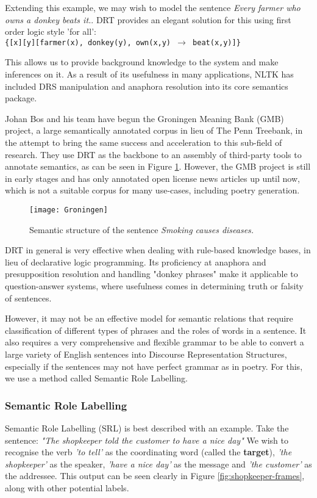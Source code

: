 Extending this example, we may wish to model the sentence \textit{Every farmer who owns a donkey beats it.}. DRT provides an elegant solution for this using first order logic style 'for all':\\
\texttt{\{[x][y][farmer(x), donkey(y), own(x,y) $\rightarrow$ beat(x,y)]\}}

This allows us to provide background knowledge to the system and make inferences on it. As a result of its usefulness in many applications, NLTK has included DRS manipulation and anaphora resolution into its core semantics package.

Johan Bos and his team have begun the Groningen Meaning Bank (GMB) project\cite{BasileBosEvangVenhuizen2012LREC}, a large semantically annotated corpus in lieu of The Penn Treebank, in the attempt to bring the same success and acceleration to this sub-field of research. They use DRT as the backbone to an assembly of third-party tools to annotate semantics, as can be seen in Figure \ref{fig:gmb}. However, the GMB project is still in early stages and has only annotated open license news articles up until now, which is not a suitable corpus for many use-cases, including poetry generation.

\begin{figure}[h!]
\centering
\texttt{[image: Groningen]}
\caption{Semantic structure of the sentence \textit{Smoking causes diseases.}}
\label{fig:gmb}
\end{figure}

DRT in general is very effective when dealing with rule-based knowledge bases, in lieu of declarative logic programming. Its proficiency at anaphora and presupposition resolution and handling "donkey phrases" make it applicable to question-answer systems, where usefulness comes in determining truth or falsity of sentences.

However, it may not be an effective model for semantic relations that require classification of different types of phrases and the roles of words in a sentence. It also requires a very comprehensive and flexible grammar to be able to convert a large variety of English sentences into Discourse Representation Structures, especially if the sentences may not have perfect grammar as in poetry. For this, we use a method called Semantic Role Labelling.

\subsubsection{Semantic Role Labelling}
Semantic Role Labelling (SRL) is best described with an example. Take the sentence:
{\centering\textit{"The shopkeeper told the customer to have a nice day"}}
We wish to recognise the verb \textit{'to tell'} as the coordinating word (called the \textbf{target}), \textit{'the shopkeeper'} as the speaker, \textit{'have a nice day'} as the message and \textit{'the customer'} as the addressee. This output can be seen clearly in Figure \ref{fig:shopkeeper-frames}, along with other potential labels. 

